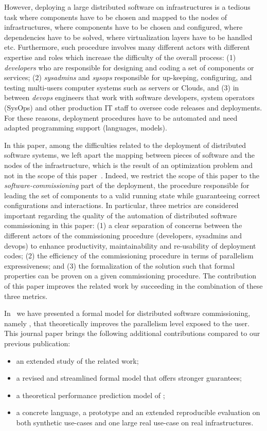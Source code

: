 However, deploying a large distributed software on infrastructures is a tedious task where components have to be chosen and mapped to the nodes of infrastructures, where components have to be chosen and configured, where dependencies have to be solved, where virtualization layers have to be handled etc. Furthermore, such procedure involves many different actors with different expertise and roles which increase the difficulty of the overall process: (1) \emph{developers} who are responsible for designing and coding a set of components or services; (2) \emph{sysadmins} and \emph{sysops} responsible for up-keeping, configuring, and testing multi-users computer systems such as servers or Clouds, and (3) in between \emph{devops} engineers that work with software developers, system operators (SysOps) and other production IT staff to oversee code releases and deployments. For these reasons, deployment procedures have to be automated and need adapted programming support (\ie languages, models).

In this paper, among the difficulties related to the deployment of distributed software systems, we left apart the mapping between pieces of software and the nodes of the infrastructure, which is the result of an optimization problem and not in the scope of this paper~\cite{6409358, 10.1007/978-3-319-47677-3_15, cadorel:hal-02165835, ccgridemile}. Indeed, we restrict the scope of this paper to the \emph{software-commissioning} part of the deployment, \ie the procedure responsible for leading the set of components to a valid running state while guaranteeing correct configurations and interactions.
%
In particular, three metrics are considered important regarding the quality of
the automation of distributed software commissioning in this paper: (1) a clear separation of concerns between the different actors of the commissioning procedure (\ie developers, sysadmins and devops) to enhance productivity, maintainability
and re-usability of deployment codes; (2) the efficiency of the commissioning procedure in terms of parallelism expressiveness; and (3) the formalization of the solution such that formal properties can be proven on a given commissioning procedure. The contribution of this paper improves the related work by succeeding in the combination of these three metrics.
%

In~\cite{chardet:hal-01858150} we have presented a formal model for distributed software commissioning, namely \mad, that theoretically improves the parallelism
level exposed to the user. This journal paper brings the following additional
contributions compared to our previous publication: 
\begin{itemize} 
	\item an extended study of the related work; 
	\item a revised and streamlined \mad formal	model that offers stronger guarantees; 
	\item a theoretical performance prediction model of \mad; 
	\item a concrete language, a prototype and an extended reproducible evaluation on both synthetic use-cases and one large real use-case on real infrastructures.
\end{itemize}

